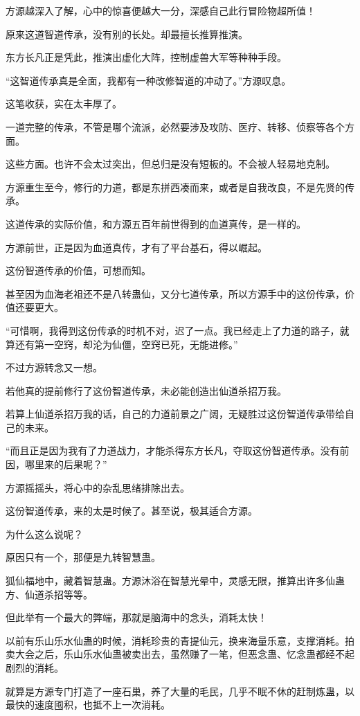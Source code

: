 \begin{this_body}
方源越深入了解，心中的惊喜便越大一分，深感自己此行冒险物超所值！

原来这道智道传承，没有别的长处。却最擅长推算推演。

东方长凡正是凭此，推演出虚化大阵，控制虚兽大军等种种手段。

“这智道传承真是全面，我都有一种改修智道的冲动了。”方源叹息。

这笔收获，实在太丰厚了。

一道完整的传承，不管是哪个流派，必然要涉及攻防、医疗、转移、侦察等各个方面。

这些方面。也许不会太过突出，但总归是没有短板的。不会被人轻易地克制。

方源重生至今，修行的力道，都是东拼西凑而来，或者是自我改良，不是先贤的传承。

这道传承的实际价值，和方源五百年前世得到的血道真传，是一样的。

方源前世，正是因为血道真传，才有了平台基石，得以崛起。

这份智道传承的价值，可想而知。

甚至因为血海老祖还不是八转蛊仙，又分七道传承，所以方源手中的这份传承，价值还要更大。

“可惜啊，我得到这份传承的时机不对，迟了一点。我已经走上了力道的路子，就算还有第一空窍，却沦为仙僵，空窍已死，无能进修。”

不过方源转念又一想。

若他真的提前修行了这份智道传承，未必能创造出仙道杀招万我。

若算上仙道杀招万我的话，自己的力道前景之广阔，无疑胜过这份智道传承带给自己的未来。

“而且正是因为我有了力道战力，才能杀得东方长凡，夺取这份智道传承。没有前因，哪里来的后果呢？”

方源摇摇头，将心中的杂乱思绪排除出去。

这份智道传承，来的太是时候了。甚至说，极其适合方源。

为什么这么说呢？

原因只有一个，那便是九转智慧蛊。

狐仙福地中，藏着智慧蛊。方源沐浴在智慧光晕中，灵感无限，推算出许多仙蛊方、仙道杀招等等。

但此举有一个最大的弊端，那就是脑海中的念头，消耗太快！

以前有乐山乐水仙蛊的时候，消耗珍贵的青提仙元，换来海量乐意，支撑消耗。拍卖大会之后，乐山乐水仙蛊被卖出去，虽然赚了一笔，但恶念蛊、忆念蛊都经不起剧烈的消耗。

就算是方源专门打造了一座石巢，养了大量的毛民，几乎不眠不休的赶制炼蛊，以最快的速度囤积，也抵不上一次消耗。


\end{this_body}
